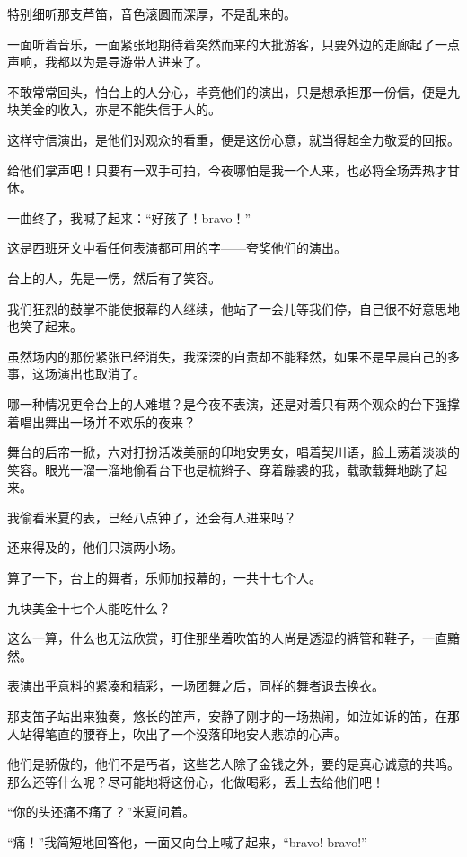 \par 特别细听那支芦笛，音色滚圆而深厚，不是乱来的。
\par 一面听着音乐，一面紧张地期待着突然而来的大批游客，只要外边的走廊起了一点声响，我都以为是导游带人进来了。
\par 不敢常常回头，怕台上的人分心，毕竟他们的演出，只是想承担那一份信，便是九块美金的收入，亦是不能失信于人的。
\par 这样守信演出，是他们对观众的看重，便是这份心意，就当得起全力敬爱的回报。
\par 给他们掌声吧！只要有一双手可拍，今夜哪怕是我一个人来，也必将全场弄热才甘休。
\par 一曲终了，我喊了起来：“好孩子！bravo！”
\par 这是西班牙文中看任何表演都可用的字——夸奖他们的演出。
\par 台上的人，先是一愣，然后有了笑容。
\par 我们狂烈的鼓掌不能使报幕的人继续，他站了一会儿等我们停，自己很不好意思地也笑了起来。
\par 虽然场内的那份紧张已经消失，我深深的自责却不能释然，如果不是早晨自己的多事，这场演出也取消了。
\par 哪一种情况更令台上的人难堪？是今夜不表演，还是对着只有两个观众的台下强撑着唱出舞出一场并不欢乐的夜来？
\par 舞台的后帘一掀，六对打扮活泼美丽的印地安男女，唱着契川语，脸上荡着淡淡的笑容。眼光一溜一溜地偷看台下也是梳辫子、穿着蹦裘的我，载歌载舞地跳了起来。
\par 我偷看米夏的表，已经八点钟了，还会有人进来吗？
\par 还来得及的，他们只演两小场。
\par 算了一下，台上的舞者，乐师加报幕的，一共十七个人。
\par 九块美金十七个人能吃什么？
\par 这么一算，什么也无法欣赏，盯住那坐着吹笛的人尚是透湿的裤管和鞋子，一直黯然。
\par 表演出乎意料的紧凑和精彩，一场团舞之后，同样的舞者退去换衣。
\par 那支笛子站出来独奏，悠长的笛声，安静了刚才的一场热闹，如泣如诉的笛，在那人站得笔直的腰脊上，吹出了一个没落印地安人悲凉的心声。
\par 他们是骄傲的，他们不是丐者，这些艺人除了金钱之外，要的是真心诚意的共鸣。那么还等什么呢？尽可能地将这份心，化做喝彩，丢上去给他们吧！
\par “你的头还痛不痛了？”米夏问着。
\par “痛！”我简短地回答他，一面又向台上喊了起来，“bravo! bravo!”
